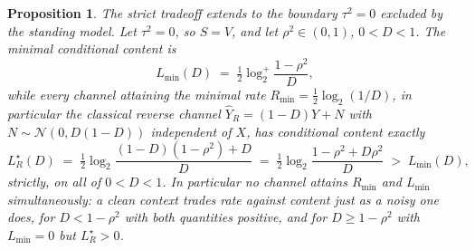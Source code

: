 \documentclass[11pt,onecolumn]{IEEEtran}
\newtheorem{proposition}[theorem]{Proposition}
\newcommand{\hY}{\widehat{Y}}
\newcommand{\LRs}{L_{R}^{\star}}
\begin{document}
\begin{proposition}\label{rem:cleanboundary}
The strict tradeoff extends to the boundary $\tau^2=0$ excluded by the
standing model. Let $\tau^2=0$, so $S=V$, and let $\rho^2\in(0,1)$,
$0<D<1$. The minimal conditional content is
\begin{equation}
L_{\min}(D)\;=\;\tfrac12\log_2^{+}\frac{1-\rho^2}{D},
\label{eq:cleanmin}
\end{equation}
while \emph{every} channel attaining the minimal rate
$R_{\min}=\tfrac12\log_2(1/D)$, in particular the classical reverse
channel $\hY_R=(1-D)Y+N$ with $N\sim\mathcal N(0,D(1-D))$ independent
of $X$, has conditional content exactly
\begin{equation}
\LRs(D)\;=\;\tfrac12\log_2\frac{(1-D)(1-\rho^2)+D}{D}
\;=\;\tfrac12\log_2\frac{1-\rho^2+D\rho^2}{D}\;>\;L_{\min}(D),
\label{eq:cleanrev}
\end{equation}
strictly, on all of $0<D<1$. In particular no channel attains
$R_{\min}$ and $L_{\min}$ simultaneously: a clean context trades rate
against content just as a noisy one does, for $D<1-\rho^2$ with both
quantities positive, and for $D\ge1-\rho^2$ with $L_{\min}=0$ but
$\LRs>0$.
\end{proposition}
\end{document}

